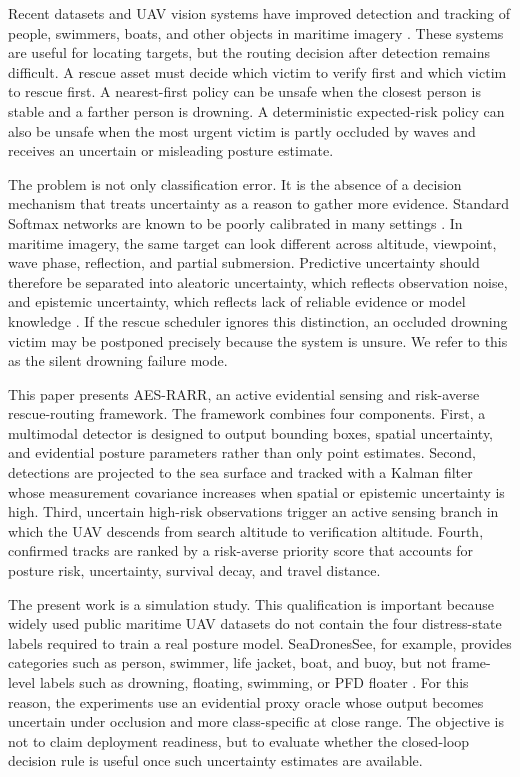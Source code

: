 \documentclass[runningheads]{llncs}
\newcommand{\aes}{AES-RARR}
\begin{document}
Recent datasets and UAV vision systems have improved detection and tracking of people, swimmers, boats, and other objects in maritime imagery \cite{varga2022seadronessee,ngo2026drowning}. These systems are useful for locating targets, but the routing decision after detection remains difficult. A rescue asset must decide which victim to verify first and which victim to rescue first. A nearest-first policy can be unsafe when the closest person is stable and a farther person is drowning. A deterministic expected-risk policy can also be unsafe when the most urgent victim is partly occluded by waves and receives an uncertain or misleading posture estimate.

The problem is not only classification error. It is the absence of a decision mechanism that treats uncertainty as a reason to gather more evidence. Standard Softmax networks are known to be poorly calibrated in many settings \cite{guo2017calibration}. In maritime imagery, the same target can look different across altitude, viewpoint, wave phase, reflection, and partial submersion. Predictive uncertainty should therefore be separated into aleatoric uncertainty, which reflects observation noise, and epistemic uncertainty, which reflects lack of reliable evidence or model knowledge \cite{kendall2017uncertainties}. If the rescue scheduler ignores this distinction, an occluded drowning victim may be postponed precisely because the system is unsure. We refer to this as the silent drowning failure mode.

This paper presents \aes, an active evidential sensing and risk-averse rescue-routing framework. The framework combines four components. First, a multimodal detector is designed to output bounding boxes, spatial uncertainty, and evidential posture parameters rather than only point estimates. Second, detections are projected to the sea surface and tracked with a Kalman filter whose measurement covariance increases when spatial or epistemic uncertainty is high. Third, uncertain high-risk observations trigger an active sensing branch in which the UAV descends from search altitude to verification altitude. Fourth, confirmed tracks are ranked by a risk-averse priority score that accounts for posture risk, uncertainty, survival decay, and travel distance.

The present work is a simulation study. This qualification is important because widely used public maritime UAV datasets do not contain the four distress-state labels required to train a real posture model. SeaDronesSee, for example, provides categories such as person, swimmer, life jacket, boat, and buoy, but not frame-level labels such as drowning, floating, swimming, or PFD floater \cite{varga2022seadronessee}. For this reason, the experiments use an evidential proxy oracle whose output becomes uncertain under occlusion and more class-specific at close range. The objective is not to claim deployment readiness, but to evaluate whether the closed-loop decision rule is useful once such uncertainty estimates are available.
\end{document}
